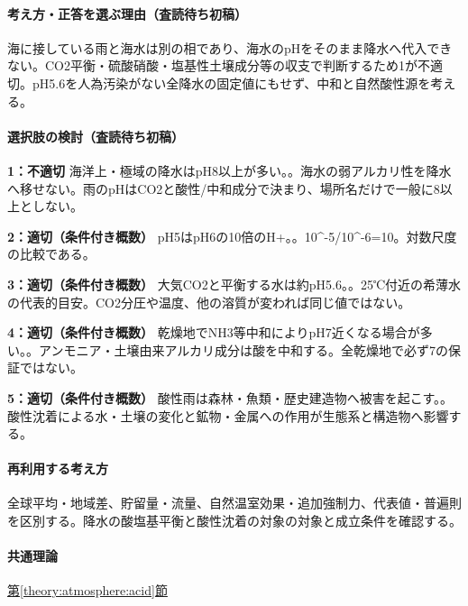 \paragraph{考え方・正答を選ぶ理由（査読待ち初稿）} 海に接している雨と海水は別の相であり、海水のpHをそのまま降水へ代入できない。CO2平衡・硫酸硝酸・塩基性土壌成分等の収支で判断するため1が不適切。pH5.6を人為汚染がない全降水の固定値にもせず、中和と自然酸性源を考える。

\paragraph{選択肢の検討（査読待ち初稿）}\mbox{}\par

\noindent\textbf{1：不適切} 海洋上・極域の降水はpH8以上が多い。。海水の弱アルカリ性を降水へ移せない。雨のpHはCO2と酸性/中和成分で決まり、場所名だけで一般に8以上としない。\par

\noindent\textbf{2：適切（条件付き概数）} pH5はpH6の10倍のH+。。10\textasciicircum{}-5/10\textasciicircum{}-6=\allowbreak{}10。対数尺度の比較である。\par

\noindent\textbf{3：適切（条件付き概数）} 大気CO2と平衡する水は約pH5.6。。25℃付近の希薄水の代表的目安。CO2分圧や温度、他の溶質が変われば同じ値ではない。\par

\noindent\textbf{4：適切（条件付き概数）} 乾燥地でNH3等中和によりpH7近くなる場合が多い。。アンモニア・土壌由来アルカリ成分は酸を中和する。全乾燥地で必ず7の保証ではない。\par

\noindent\textbf{5：適切（条件付き概数）} 酸性雨は森林・魚類・歴史建造物へ被害を起こす。。酸性沈着による水・土壌の変化と鉱物・金属への作用が生態系と構造物へ影響する。\par

\paragraph{再利用する考え方} 全球平均・地域差、貯留量・流量、自然温室効果・追加強制力、代表値・普遍則を区別する。降水の酸塩基平衡と酸性沈着の対象の対象と成立条件を確認する。

\paragraph{共通理論} \hyperref[theory:atmosphere:acid]{第\ref*{theory:atmosphere:acid}節}


